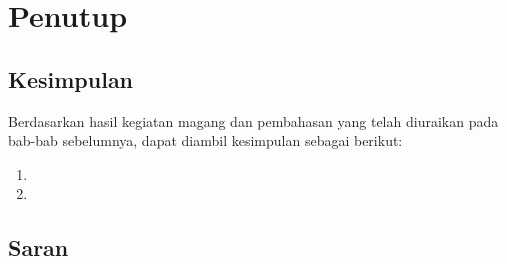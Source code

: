 \chapter{Penutup}

\section{Kesimpulan}
Berdasarkan hasil kegiatan magang dan pembahasan yang telah diuraikan pada bab-bab sebelumnya, dapat diambil kesimpulan sebagai berikut:
\begin{enumerate}
    \item \lipsum[8][1-3]
    \item \lipsum[8][4-6]
\end{enumerate}

\section{Saran}
\lipsum[9]
